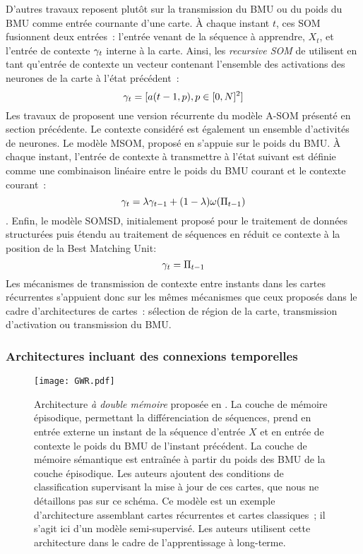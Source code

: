 \documentclass[../main]{subfiles}
\begin{document}
D'autres travaux reposent plutôt sur la transmission du BMU ou du poids du BMU comme entrée cournante d'une carte.
\`A chaque instant $t$, ces SOM fusionnent deux entrées~: l'entrée venant de la séquence à apprendre, $X_t$, et l'entrée de contexte $\gamma_t$ interne à la carte.
Ainsi, les \emph{recursive SOM} de \cite{Voegtlin2002RecursiveSM} utilisent en tant qu'entrée de contexte un vecteur contenant l'ensemble des activations des neurones de la carte à l'état précédent~: $$\gamma_t = [a(t-1,p), p \in [0,N]^2]$$
Les travaux de \cite{Buonamente2013SimulatingAW} proposent une version récurrente du modèle A-SOM présenté en section précédente. Le contexte considéré est également un ensemble d'activités de neurones. 
Le modèle MSOM, proposé en \cite{Strickert2005MergeSF} s'appuie sur le poids du BMU. 
\`A chaque instant, l'entrée de contexte à transmettre à l'état suivant est définie comme une combinaison linéaire entre le poids du BMU courant et le contexte courant~:
$$\gamma_t = \lambda \gamma_{t-1} + (1-\lambda)\omega(\Pi_{t-1}) $$.
Enfin, le modèle SOMSD, initialement proposé pour le traitement de données structurées \parencite{hagenbuchner_self-organizing_2003} puis étendu au traitement de séquences en \cite{hammer_recursive_2004,hammer_self-organizing_2005} réduit ce contexte à la position de la Best Matching Unit:
$$ \gamma_{t} = \Pi_{t-1}$$
Les mécanismes de transmission de contexte entre instants dans les cartes récurrentes s'appuient donc sur les mêmes mécanismes que ceux proposés dans le cadre d'architectures de cartes~: sélection de région de la carte, transmission d'activation ou transmission du BMU.

\subsubsection{Architectures incluant des connexions temporelles}
\begin{figure}
    \centering
    \texttt{[image: GWR.pdf]}
    \caption{Architecture \emph{à double mémoire} proposée en \cite{parisiLL}. 
    La couche de mémoire épisodique, permettant la différenciation de séquences, prend en entrée externe un instant de la séquence d'entrée $X$ et en entrée de contexte le poids du BMU de l'instant précédent.
    La couche de mémoire sémantique est entraînée à partir du poids des BMU de la couche épisodique. Les auteurs ajoutent des conditions de classification supervisant la mise à jour de ces cartes, que nous ne détaillons pas sur ce schéma. Ce modèle est un exemple d'architecture assemblant cartes récurrentes et cartes classiques~; il s'agit ici d'un modèle semi-supervisé. Les auteurs utilisent cette architecture dans le cadre de l'apprentissage à long-terme.\label{fig:parisi}}
\end{figure}
\end{document}
